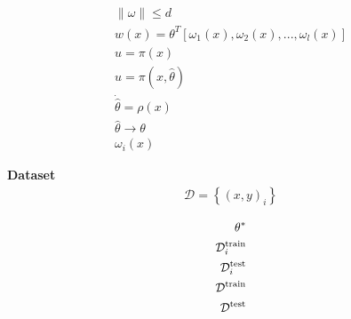 \begin{align*}
    \lVert \omega \rVert \leq d \\
    w(x) = \theta^{T} [\omega_1(x), \omega_2(x), ..., \omega_l(x)] \\
    u = \pi(x) \\
    u = \pi(x, \hat{\theta}) \\
    \dot{\hat{\theta}} = \rho(x) \\
    \hat{\theta}  \rightarrow    \theta \\
    \omega_i(x)
\end{align*}




\begin{tcolorbox}[title=Definition,
    lifted shadow={1mm}{-2mm}{3mm}{0.1mm}%
{black!50!white}]
\textbf{
    Dataset
} 
\begin{align*}
    \mathcal{D} = \left\{ (x,y)_i \right\}
\end{align*}
\end{tcolorbox}



\begin{align*}
    \theta^{*} \\
    \mathcal{D}_{i}^{{\rm train}} \\
    \mathcal{D}_{i}^{{\rm test}} \\
    \mathcal{D}^{{\rm train}} \\
    \mathcal{D}^{{\rm test}} 
\end{align*}




